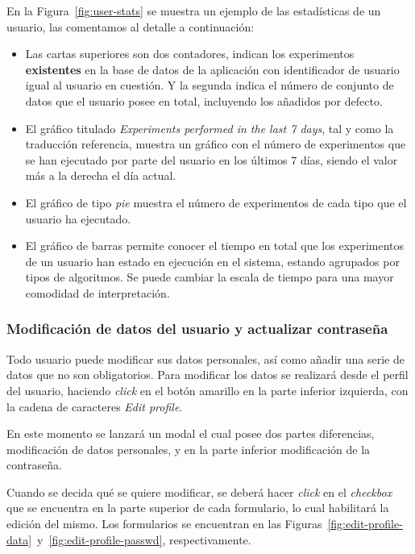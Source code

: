 En la Figura~\ref{fig:user-stats} se muestra un ejemplo de las estadísticas de un usuario, las comentamos al detalle a continuación:
\begin{itemize}
\item Las cartas superiores son dos contadores, indican los experimentos \textbf{existentes} en la base de datos de la aplicación con identificador de usuario igual al usuario en cuestión. Y la segunda indica el número de conjunto de datos que el usuario posee en total, incluyendo los añadidos por defecto.
\item El gráfico titulado \textit{Experiments performed in the last 7 days}, tal y como la traducción referencia, muestra un gráfico con el número de experimentos que se han ejecutado por parte del usuario en los últimos 7 días, siendo el valor más a la derecha el día actual.
\item El gráfico de tipo \textit{pie} muestra el número de experimentos de cada tipo que el usuario ha ejecutado.
\item El gráfico de barras permite conocer el tiempo en total que los experimentos de un usuario han estado en ejecución en el sistema, estando agrupados por tipos de algoritmos. Se puede cambiar la escala de tiempo para una mayor comodidad de interpretación.
\end{itemize}


\FloatBarrier
\subsubsection{Modificación de datos del usuario y actualizar contraseña}
Todo usuario puede modificar sus datos personales, así como añadir una serie de datos que no son obligatorios. Para modificar los datos se realizará desde el perfil del usuario, haciendo \textit{click} en el botón amarillo en la parte inferior izquierda, con la cadena de caracteres \textit{Edit profile}.

En este momento se lanzará un modal el cual posee dos partes diferencias, modificación de datos personales, y en la parte inferior modificación de la contraseña.

Cuando se decida qué se quiere modificar, se deberá hacer \textit{click} en el \textit{checkbox} que se encuentra en la parte superior de cada formulario, lo cual habilitará la edición del mismo. Los formularios se encuentran en las Figuras~\ref{fig:edit-profile-data}~y~\ref{fig:edit-profile-passwd}, respectivamente. 

